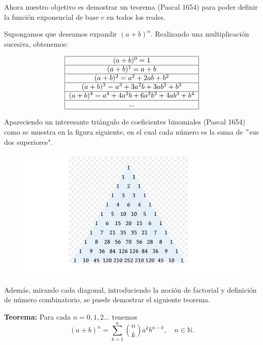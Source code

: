\documentclass[a4paper,10pt,BCOR10mm,oneside,headsepline]{scrbook}
\begin{document}
Ahora nuestro objetivo es demostrar un teorema (Pascal 1654) para poder definir la función exponencial de base $e$ en todos los reales.

Supongamos que deseamos expandir $(a+b)^n$. Realizando una multiplicación sucesiva, obtenemos:

\begin{equation}
\begin{tabular}{|c|} \hline 
$(a+b)^0=1$ \\
\hline 
$(a+b)^1=a+b$ \\ 
\hline 
$(a+b)^2=a^2+2ab+b^2$ \\ 
\hline 
$(a+b)^3=a^3+3a^2b+3ab^2+b^3$ \\ 
\hline 
$(a+b)^4=a^4+4a^3b+6a^2b^2+4ab^3+b^4$ \\ 
\hline 
... \\
\hline 
\end{tabular} 
\end{equation}
 
Apareciendo un interesante triángulo de coeficientes binomiales (Pascal 1654) como se muestra en la figura siguiente, en el cual cada número es la suma de $"$sus dos superiores". 

 \begin{figure}[h!]
    \centering				                     \includegraphics[width=0.80\linewidth]{triang2.png}
 \end{figure}

Además, mirando cada diagonal, introduciendo la noción de factorial y definición de número combinatorio, se puede demostrar el siguiente teorema.

\textbf{Teorema:}
Para cada $n=0,1,2...$ tenemos 
\begin{equation}\label{teorema2.1}
 (a+b)^n=\sum_{k=1}^n\binom{n}{k} a^kb^{n-k},\quad n\in\mathbb{N}.
\end{equation}
\end{document}
